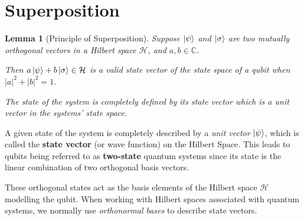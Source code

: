 \documentclass[12pt,twoside,fleqn]{report}
\theoremstyle{thmstyle}
\newtheorem{lemma}{Lemma}[chapter]
\begin{document}
\section{Superposition}
\begin{mdframed}
\begin{lemma}[Principle of Superposition]

    Suppose $\ket{\psi}$ and $\ket{\sigma}$ are two mutually orthogonal vectors in a Hilbert space $\mathcal{H}$, and $a, b \in \mathbb{C}$. 

    Then $a \ket{\psi} + b \ket{\sigma} \in \mathcal{H}$ is a valid state vector of the state space of a qubit when $|a|^2 + |b|^2 = 1$. 

    The state of the system is completely defined by its state vector which is a unit vector in the systems' state space.
\end{lemma}
\end{mdframed}

A given state of the system is completely described by a \textit{unit vector} $\ket{\psi}$, which is called the \textbf{state vector} (or wave function) on the Hilbert Space. This leads to qubits being referred to as \textbf{two-state} quantum systems since its state is the linear combination of two orthogonal basis vectors. 

These orthogonal states act as the basis elements of the Hilbert space $\mathcal{H}$ modelling the qubit. When working with Hilbert spaces associated with quantum systems, we normally use \textit{orthonormal bases} to describe state vectors.
\end{document}
